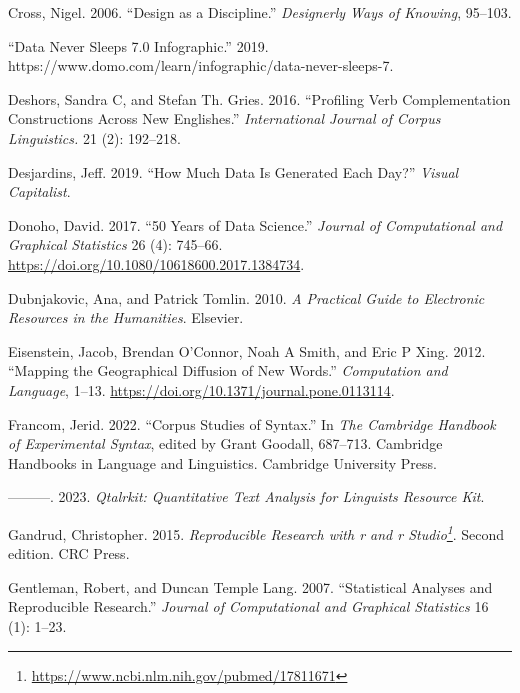 \documentclass[
  letterpaper,
]{latex/krantz}
\newlength{\cslhangindent}
\newlength{\cslentryspacingunit} %
\newenvironment{CSLReferences}[2] %
 {%
  \setlength{\parindent}{0pt}
  \ifodd #1
  \let\oldpar\par
  \def\par{\hangindent=\cslhangindent\oldpar}
  \fi
  \setlength{\parskip}{#2\cslentryspacingunit}
 }%
 {}
\DeclareRobustCommand{\href}[2]{#2\footnote{\url{#1}}}
\begin{document}
\begin{CSLReferences}{1}{0}
\leavevmode{}%
Cross, Nigel. 2006. {``Design as a Discipline.''} \emph{Designerly Ways
of Knowing}, 95--103.

\leavevmode{}%
{``Data Never Sleeps 7.0 Infographic.''} 2019.
https://www.domo.com/learn/infographic/data-never-sleeps-7.

\leavevmode{}%
Deshors, Sandra C, and Stefan Th. Gries. 2016. {``Profiling Verb
Complementation Constructions Across New Englishes.''}
\emph{International Journal of Corpus Linguistics.} 21 (2): 192--218.

\leavevmode{}%
Desjardins, Jeff. 2019. {``How Much Data Is Generated Each Day?''}
\emph{Visual Capitalist}.

\leavevmode{}%
Donoho, David. 2017. {``50 Years of Data Science.''} \emph{Journal of
Computational and Graphical Statistics} 26 (4): 745--66.
\url{https://doi.org/10.1080/10618600.2017.1384734}.

\leavevmode{}%
Dubnjakovic, Ana, and Patrick Tomlin. 2010. \emph{A Practical Guide to
Electronic Resources in the Humanities}. Elsevier.

\leavevmode{}%
Eisenstein, Jacob, Brendan O'Connor, Noah A Smith, and Eric P Xing.
2012. {``Mapping the Geographical Diffusion of New Words.''}
\emph{Computation and Language}, 1--13.
\url{https://doi.org/10.1371/journal.pone.0113114}.

\leavevmode{}%
Francom, Jerid. 2022. {``Corpus Studies of Syntax.''} In \emph{The
Cambridge Handbook of Experimental Syntax}, edited by Grant Goodall,
687--713. Cambridge Handbooks in Language and Linguistics. Cambridge
University Press.

\leavevmode{}%
---------. 2023. \emph{Qtalrkit: Quantitative Text Analysis for
Linguists Resource Kit}.

\leavevmode{}%
Gandrud, Christopher. 2015.
\emph{\href{https://www.ncbi.nlm.nih.gov/pubmed/17811671}{Reproducible
Research with r and r Studio}}. Second edition. CRC Press.

\leavevmode{}%
Gentleman, Robert, and Duncan Temple Lang. 2007. {``Statistical Analyses
and Reproducible Research.''} \emph{Journal of Computational and
Graphical Statistics} 16 (1): 1--23.


\end{CSLReferences}
\end{document}
